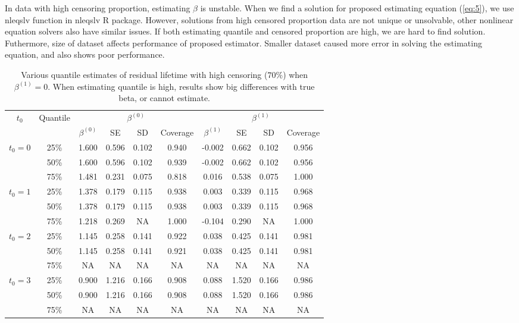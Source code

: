 \documentclass[12pt]{article}
\begin{document}
	In data with high censoring proportion, estimating $\beta$ is unstable. When we find a solution for proposed estimating equation (\ref{eq:5}), we use nleqslv function in nleqslv R package. However, solutions from high censored proportion data are not unique or unsolvable, other nonlinear equation solvers also have similar issues. If both estimating quantile and censored proportion are high, we are hard to find solution. Futhermore, size of dataset affects performance of proposed estimator. Smaller dataset caused more error in solving the estimating equation, and also shows poor performance. 
	
	\begin{table}[H]
		\caption{Various quantile estimates of residual lifetime with high censoring ($70\%$) when $\beta^{(1)} = 0$. When estimating quantile is high, results show big differences with true beta, or cannot estimate.}
		\centering
		\begin{tabular}{|c|c|c|c|c|c|c|c|c|c|}
			\hline
			\multirow{2}{*}{$t_0$} & \multirow{2}{*}{Quantile} & \multicolumn{4}{c|}{$\beta^{(0)}$} & \multicolumn{4}{c|}{$\beta^{(1)}$}\\ \cline{3-10}
			& & $\beta^{(0)}$ & SE & SD  & Coverage  & $\beta^{(1)}$ & SE & SD & Coverage\\
			\hline\hline
			\multirow{3}{*}{$t_0=0$} & 25\% & 1.600 & 0.596 & 0.102 & 0.940 & -0.002 & 0.662 & 0.102 & 0.956 \\
			& 50\% & 1.600 & 0.596 & 0.102 & 0.939 & -0.002 & 0.662 & 0.102 & 0.956 \\ 
			& 75\% & 1.481 & 0.231 & 0.075 & 0.818 & 0.016 & 0.538 & 0.075 & 1.000 \\ 
			\hline
			\multirow{3}{*}{$t_0=1$} & 25\% & 1.378 & 0.179 & 0.115 & 0.938 & 0.003 & 0.339 & 0.115 & 0.968 \\
			& 50\% & 1.378 & 0.179 & 0.115 & 0.938 & 0.003 & 0.339 & 0.115 & 0.968 \\
			& 75\% & 1.218 & 0.269 & NA & 1.000 & -0.104 & 0.290 & NA & 1.000 \\ 
			\hline
			\multirow{3}{*}{$t_0=2$} & 25\% & 1.145 & 0.258 & 0.141 & 0.922 & 0.038 & 0.425 & 0.141 & 0.981 \\ 
			& 50\% & 1.145 & 0.258 & 0.141 & 0.921 & 0.038 & 0.425 & 0.141 & 0.981 \\ 
			& 75\% & NA & NA & NA & NA & NA & NA & NA & NA \\ 
			\hline
			\multirow{3}{*}{$t_0=3$} & 25\% & 0.900 & 1.216 & 0.166 & 0.908 & 0.088 & 1.520 & 0.166 & 0.986 \\ 
			& 50\% & 0.900 & 1.216 & 0.166 & 0.908 & 0.088 & 1.520 & 0.166 & 0.986 \\ 
			& 75\% & NA & NA & NA & NA & NA & NA & NA & NA \\ 
			\hline
		\end{tabular}
	\end{table}
\end{document}

